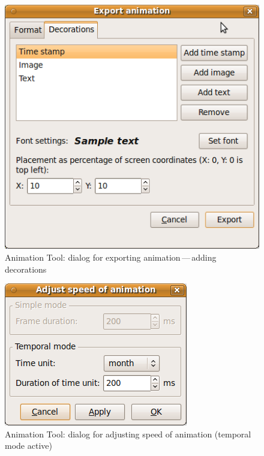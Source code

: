 \documentclass[a4paper,12pt,oneside]{book}
\newcommand{\at}{Animation Tool\xspace}
\newcommand{\dash}{\mbox{\,---\,}}
\begin{document}
\begin{figure}[h!]
  \centering
  \includegraphics{./images/animation_tool_export.png}
  \caption{\at: dialog for exporting animation\dash adding decorations}
  \label{fig:anim_export}
\end{figure}

\begin{figure}[h!]
  \centering
  \includegraphics{./images/animation_tool_speed.png}
  \caption{\at: dialog for adjusting speed of animation (temporal mode active)}
  \label{fig:anim_speed}
\end{figure}
\end{document}
